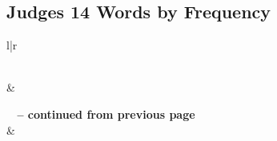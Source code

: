 

\subsection{Judges 14 Words by Frequency}


\normalsize
 
\begin{center}
\begin{longtable}{l|r}
\caption[Judges 14 Words by Frequency]{Judges 14 Words by Frequency}\label{table:WordsbyFrequency for Judges 14} \\
\hline {} &  \\ \hline 
\endfirsthead
 
{{\bfseries \tablename\ \thetable{} -- continued from previous page}} \\  
\hline {} &  \\ \hline 
\endhead
 

\end{longtable}
\end{center}
